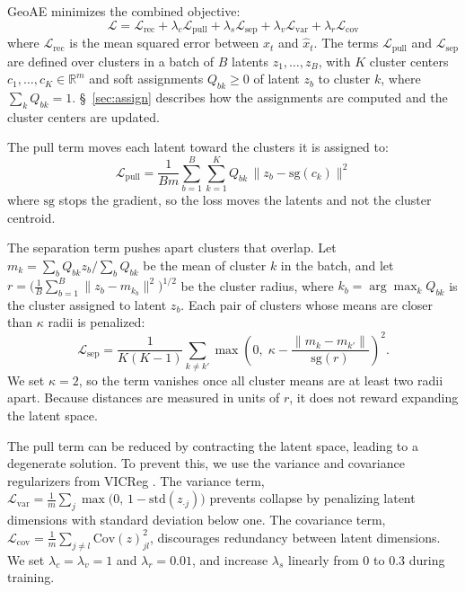 \documentclass[11pt]{article}
\begin{document}
GeoAE minimizes the combined objective:
\begin{equation}
\textstyle
  \mathcal{L} = \mathcal{L}_{\mathrm{rec}}
  + \lambda_c \mathcal{L}_{\mathrm{pull}}
  + \lambda_s \mathcal{L}_{\mathrm{sep}}
  + \lambda_v \mathcal{L}_{\mathrm{var}}
  + \lambda_r \mathcal{L}_{\mathrm{cov}} 
  \label{eq:loss}
\end{equation}
where $\mathcal{L}_{\mathrm{rec}}$ is the mean squared error between $x_t$ and $\hat{x}_t$. The terms $\mathcal{L}_{\mathrm{pull}}$ and $\mathcal{L}_{\mathrm{sep}}$ are defined over clusters in a batch of $B$ latents $z_1,\dots,z_B$, with $K$ cluster centers $c_1,\dots,c_K \in \mathbb{R}^{m}$ and soft assignments $Q_{bk}\geq 0$ of latent $z_b$ to cluster $k$, where $\sum_k Q_{bk}=1$. \S~\ref{sec:assign} describes how the assignments are computed and the cluster centers are updated.

The pull term moves each latent toward the clusters it is assigned to:
\begin{equation}
\textstyle
  \mathcal{L}_{\mathrm{pull}} = \frac{1}{B m} \sum_{b=1}^{B} \sum_{k=1}^{K} Q_{bk}\, \lVert z_b - \mathrm{sg}(c_k) \rVert^2 
\end{equation}
where $\mathrm{sg}$ stops the gradient, so the loss moves the latents and not the cluster centroid.

The separation term pushes apart clusters that overlap. Let $m_k = \sum_b Q_{bk}z_b / \sum_b Q_{bk}$ be the mean of cluster $k$ in the batch, and let $r = \bigl(\frac{1}{B}\sum_{b=1}^{B}\lVert z_b-m_{k_b}\rVert^2\bigr)^{1/2}$ be the cluster radius, where $k_b=\arg\max_k Q_{bk}$ is the cluster assigned to latent $z_b$. Each pair of clusters whose means are closer than $\kappa$ radii is penalized:
\begin{equation}
\textstyle
\mathcal{L}_{\mathrm{sep}}
= \frac{1}{K(K-1)}
\sum_{k \neq k'}
\max\!\left(
0,\;
\kappa - \frac{\lVert m_k - m_{k'} \rVert}{\mathrm{sg}(r)}
\right)^2 .
\end{equation}
We set $\kappa=2$, so the term vanishes once all cluster means are at least two radii apart. Because distances are measured in units of $r$, it does not reward expanding the latent space.




The pull term can be reduced by contracting the latent space, leading to a degenerate solution. To prevent this, we use the variance and covariance regularizers from VICReg \citep{bardes2022vicreg}. The variance term, $\mathcal{L}_{\mathrm{var}} = \frac{1}{m} \sum_j \max\big(0,\, 1 - \mathrm{std}(z_{\cdot j})\big)$ prevents collapse by penalizing latent dimensions with standard deviation below one. The covariance term, $\mathcal{L}_{\mathrm{cov}} = \frac{1}{m} \sum_{j \neq l} \mathrm{Cov}(z)_{jl}^2$, discourages redundancy between latent dimensions. We set $\lambda_c=\lambda_v=1$ and $\lambda_r=0.01$, and increase $\lambda_s$ linearly from $0$ to $0.3$ during training.
\end{document}

